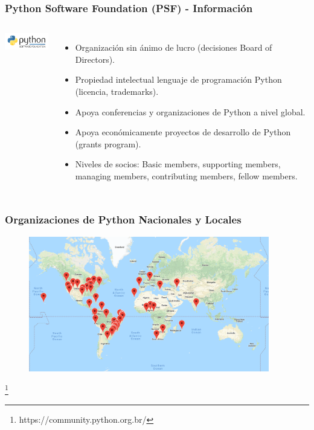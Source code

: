 \documentclass[18pt]{beamer}
\newcommand\blfootnote[1]{%
  \begingroup
  \renewcommand\thefootnote{}\footnote{#1}%
  \addtocounter{footnote}{-1}%
  \endgroup
}
\begin{document}
\begin{frame}

	\frametitle{Python Software Foundation (PSF) - Información}
		
	\begin{columns}
		\centering
			\includegraphics[width=3.5cm]{images/psf.png}
			
		\begin{itemize}
			\setlength\itemsep{0.6em}		
			\item Organización sin ánimo de lucro (decisiones Board of Directors).
			\item Propiedad intelectual lenguaje de programación Python (licencia, trademarks).
			\item Apoya conferencias y organizaciones de Python a nivel global.
			\item Apoya económicamente proyectos de desarrollo de Python (grants program).
			\item Niveles de socios: Basic members, supporting members, managing members, 
			contributing members, fellow members.  
		\end{itemize}
	\end{columns}
	
\end{frame}


\begin{frame}

	\frametitle{Organizaciones de Python Nacionales y Locales}
	
	\begin{figure}
		\includegraphics[width=10.5cm]{images/local_communities.png}
	\end{figure}
	
	\blfootnote{\scriptsize https://community.python.org.br/}
	
\end{frame}
\end{document}

